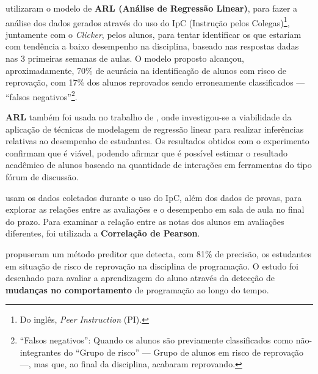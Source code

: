 \documentclass[
	12pt,				%
	openright,			%
	oneside,
	a4paper,			%
	english,			%
	french,				%
	spanish,			%
	brazil,				%
	]{abntex2}
\begin{document}




 utilizaram o modelo de \textbf{ARL (Análise de Regressão Linear)}, para fazer a análise dos dados gerados através do uso do IpC (Instrução pelos Colegas)\footnote[2]{Do inglês, \textit{Peer Instruction} (PI).}, juntamente com o \textit{Clicker}, pelos alunos, para tentar identificar os que estariam com tendência a baixo desempenho na disciplina, baseado nas respostas dadas nas 3 primeiras semanas de aulas. O modelo proposto alcançou, aproximadamente, 70\% de acurácia na identificação de alunos com risco de reprovação, com 17\% dos alunos reprovados sendo erroneamente classificados --- ``falsos negativos''\footnote[3]{``Falsos negativos'': Quando os alunos são previamente classificados como não-integrantes do ``Grupo de risco'' --- Grupo de alunos em risco de reprovação ---, mas que, ao final da disciplina, acabaram reprovando.}.

\textbf{ARL} também foi usada no trabalho de , onde investigou-se a viabilidade da aplicação de técnicas de modelagem de regressão linear para realizar inferências relativas ao desempenho de estudantes. Os resultados obtidos com o experimento confirmam que é viável, podendo afirmar que é possível estimar o resultado acadêmico de alunos baseado na quantidade de interações em ferramentas do tipo fórum de discussão. 

 usam os dados coletados durante o uso do IpC, além dos dados de provas, para explorar as relações entre as avaliações e o desempenho em sala de aula no final do prazo. Para examinar a relação entre as notas dos alunos em avaliações diferentes, foi utilizada a \textbf{Correlação de Pearson}.

 propuseram um método preditor que detecta, com 81\% de precisão, os estudantes em situação de risco de reprovação na disciplina de programação. O estudo foi desenhado para avaliar a aprendizagem do aluno através da detecção de \textbf{mudanças no comportamento} de programação ao longo do tempo.
\end{document}
